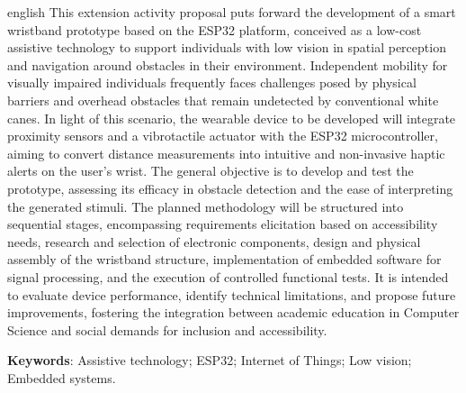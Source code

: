 \begin{resumo}[Abstract]
 \begin{otherlanguage*}{english}
This extension activity proposal puts forward the development of a smart wristband prototype based on the ESP32 platform, conceived as a low-cost assistive technology to support individuals with low vision in spatial perception and navigation around obstacles in their environment. Independent mobility for visually impaired individuals frequently faces challenges posed by physical barriers and overhead obstacles that remain undetected by conventional white canes. In light of this scenario, the wearable device to be developed will integrate proximity sensors and a vibrotactile actuator with the ESP32 microcontroller, aiming to convert distance measurements into intuitive and non-invasive haptic alerts on the user's wrist. The general objective is to develop and test the prototype, assessing its efficacy in obstacle detection and the ease of interpreting the generated stimuli. The planned methodology will be structured into sequential stages, encompassing requirements elicitation based on accessibility needs, research and selection of electronic components, design and physical assembly of the wristband structure, implementation of embedded software for signal processing, and the execution of controlled functional tests. It is intended to evaluate device performance, identify technical limitations, and propose future improvements, fostering the integration between academic education in Computer Science and social demands for inclusion and accessibility.

   \vspace{\onelineskip}
 
   \noindent 
   \textbf{Keywords}: Assistive technology; ESP32; Internet of Things; Low vision; Embedded systems.
 \end{otherlanguage*}
\end{resumo}
